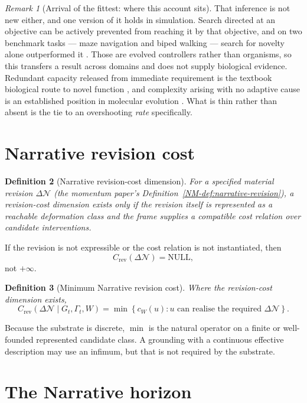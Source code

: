 \documentclass[11pt,a4paper]{article}
\newtheorem{definition}{Definition}[section]
\theoremstyle{remark}
\newtheorem{remark}[definition]{Remark}
\newcommand{\Narr}{\mathcal N}
\newcommand{\Null}{\mathrm{NULL}}
\begin{document}
\begin{remark}[Arrival of the fittest: where this account sits]
That inference is not new either, and one version of it holds in simulation. Search directed at an
objective can be actively prevented from reaching it by that objective, and on two benchmark tasks
--- maze navigation and biped walking --- search for novelty alone outperformed it
\citep{lehmanstanley2011}. Those are evolved controllers rather than organisms, so this transfers a
result across domains and does not supply biological evidence. Redundant capacity released from
immediate requirement is the textbook biological route to novel function \citep{ohno1970}, and
complexity arising with no adaptive cause is an established position in molecular evolution
\citep{stoltzfus1999,lukes2011}. What is thin rather than absent is the tie to an overshooting
\emph{rate} specifically.
\end{remark}

\section{Narrative revision cost}\label{sec:revision-cost}

\begin{definition}[Narrative revision-cost dimension]\label{def:revision-cost-dimension}
For a specified material revision $\Delta\Narr$ (the momentum paper's Definition~\ref{NM-def:narrative-revision}), a revision-cost dimension exists only if the revision itself is represented as a reachable deformation class and the frame supplies a compatible cost relation over candidate interventions.
\end{definition}

If the revision is not expressible or the cost relation is not instantiated, then
\[
C_{\mathrm{rev}}(\Delta\Narr)=\Null,
\]
not $+\infty$.

\begin{definition}[Minimum Narrative revision cost]\label{def:revision-cost}
Where the revision-cost dimension exists,
\[
\boxed{
C_{\mathrm{rev}}
(\Delta\Narr\mid G_t,\Gamma_t,W)
=
\min
\left\{
c_W(u):
u\text{ can realise the required }\Delta\Narr
\right\}.
}
\]
\end{definition}

Because the substrate is discrete, $\min$ is the natural operator on a finite or well-founded represented candidate class. A grounding with a continuous effective description may use an infimum, but that is not required by the substrate.

\section{The Narrative horizon}\label{sec:horizon}
\end{document}
